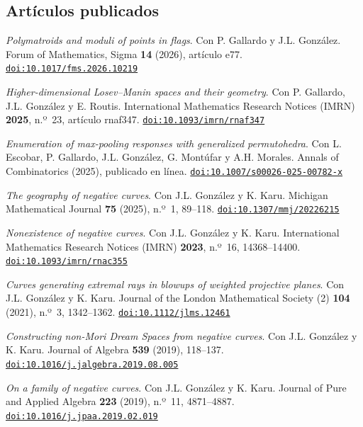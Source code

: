 \documentclass[11pt]{article}
\newcommand{\doi}[1]{\href{https://doi.org/#1}{\texttt{doi:#1}}}
\newcommand{\pubspacing}{\setlength{\itemsep}{3pt}\setlength{\parsep}{0pt}\raggedright}
\begin{document}
\subsection*{Artículos publicados}
\begin{etaremune}[start=8]\pubspacing
  \item \emph{Polymatroids and moduli of points in flags}.
        Con P. Gallardo y J.L. González.
        Forum of Mathematics, Sigma \textbf{14} (2026), artículo e77.
        \doi{10.1017/fms.2026.10219}

  \item \emph{Higher-dimensional Losev--Manin spaces and their geometry}.
        Con P. Gallardo, J.L. González y E. Routis.
        International Mathematics Research Notices (IMRN) \textbf{2025}, n.º~23, artículo rnaf347.
        \doi{10.1093/imrn/rnaf347}

  \item \emph{Enumeration of max-pooling responses with generalized permutohedra}.
        Con L. Escobar, P. Gallardo, J.L. González, G. Montúfar y A.H. Morales.
        Annals of Combinatorics (2025), publicado en línea.
        \doi{10.1007/s00026-025-00782-x}

  \item \emph{The geography of negative curves}.
        Con J.L. González y K. Karu.
        Michigan Mathematical Journal \textbf{75} (2025), n.º~1, 89--118.
        \doi{10.1307/mmj/20226215}

  \item \emph{Nonexistence of negative curves}.
        Con J.L. González y K. Karu.
        International Mathematics Research Notices (IMRN) \textbf{2023}, n.º~16, 14368--14400.
        \doi{10.1093/imrn/rnac355}

  \item \emph{Curves generating extremal rays in blowups of weighted projective planes}.
        Con J.L. González y K. Karu.
        Journal of the London Mathematical Society (2) \textbf{104} (2021), n.º~3, 1342--1362.
        \doi{10.1112/jlms.12461}

  \item \emph{Constructing non-Mori Dream Spaces from negative curves}.
        Con J.L. González y K. Karu.
        Journal of Algebra \textbf{539} (2019), 118--137.
        \doi{10.1016/j.jalgebra.2019.08.005}

  \item \emph{On a family of negative curves}.
        Con J.L. González y K. Karu.
        Journal of Pure and Applied Algebra \textbf{223} (2019), n.º~11, 4871--4887.
        \doi{10.1016/j.jpaa.2019.02.019}
\end{etaremune}
\end{document}
